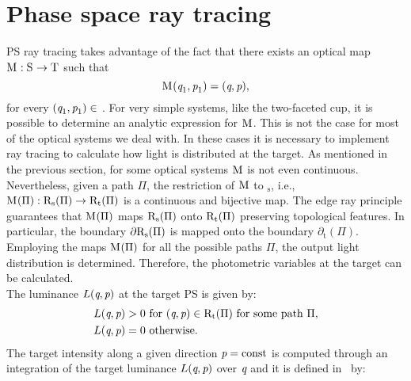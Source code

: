 \section{Phase space ray tracing}\label{sec:PS_raytracing}
PS ray tracing takes advantage of the fact that there exists an optical map
$
\mathrm{M}_{\textit{}}: \mbox{$\textup{S}_{\textit{}}$} \rightarrow \mbox{$\textup{T}_{\textit{}}$}
$
 such that
\begin{equation}\label{eq:map1}
\mathrm{M}_{\textit{}}(\textit{q}_1,\textit{p}_1)=(\textit{q},\textit{p}),
\end{equation} for every $(\textit{q}_1,\textit{p}_1)\in$ .
For very simple systems, like the two-faceted cup, it is possible to determine an analytic expression for $\mathrm{M}_{\textit{}}$.
This is not the case for most of the optical systems we deal with. In these cases it is necessary to implement ray tracing to calculate how light is distributed at the target.
As mentioned in the previous section, for some optical systems $\mathrm{M}_{\textit{}}$ is not even continuous.
Nevertheless, given a path $\Pi$, the restriction of $\mathrm{M}_{\textit{}}$ to $_\textrm{s}$, 
i.e., $\mathrm{M}_{\textit{}}(\Pi): \mbox{$\textup{R}$}_\textrm{s}(\Pi)\rightarrow 
\mbox{$\textup{R}$}_\textrm{t}(\Pi)$ is a continuous and bijective map. 
The edge ray principle guarantees that $\mathrm{M}_{\textit{}}(\Pi)$ maps $\mbox{$\textup{R}$}_\textrm{s}(\Pi)$ onto $\mbox{$\textup{R}$}_\textrm{t}(\Pi)$ preserving topological features. In particular, the boundary $\partial\mbox{$\textup{R}$}_\textrm{s}(\Pi)$ is mapped onto the boundary $\partial$$_\textrm{t}(\Pi)$. %
Employing the maps $\mathrm{M}_{\textit{}}(\Pi)$ for all the possible paths $\Pi$, the output light distribution is determined. Therefore, the photometric variables at the target can be calculated.
\\ \indent The luminance $L(\textit{q}, \textit{p})$ at the target PS is given by:
\begin{equation}
\begin{aligned}
\label{eq:PSluminance}
L(\variabile{q}, \variabile{p}) &> 0  \mbox{  for } (\variabile{q}, \variabile{p})\in \mbox{\insieme{R}}_\textrm{t}(\Pi) \mbox{ for some path } \Pi,\\ \vspace{0.5 cm}
L(\variabile{q}, \variabile{p}) &= 0  \mbox{  otherwise}.
\end{aligned}
\end{equation}
The target intensity along a given direction $\textit{p}=\textrm{const}$ is computed through an integration of the target luminance $L(\textit{q}, \textit{p})$ over $\textit{q}$ and it is defined in $\,$ by:
